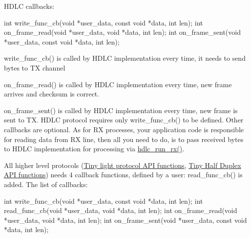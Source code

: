 H\+D\+LC callbacks\+: 
\begin{DoxyCode}
\textcolor{keywordtype}{int} write\_func\_cb(\textcolor{keywordtype}{void} *user\_data, \textcolor{keyword}{const} \textcolor{keywordtype}{void} *data, \textcolor{keywordtype}{int} len);
\textcolor{keywordtype}{int} on\_frame\_read(\textcolor{keywordtype}{void} *user\_data, \textcolor{keywordtype}{void} *data, \textcolor{keywordtype}{int} len);
\textcolor{keywordtype}{int} on\_frame\_sent(\textcolor{keywordtype}{void} *user\_data, \textcolor{keyword}{const} \textcolor{keywordtype}{void} *data, \textcolor{keywordtype}{int} len);
\end{DoxyCode}



\begin{DoxyItemize}
\item write\+\_\+func\+\_\+cb() is called by H\+D\+LC implementation every time, it needs to send bytes to TX channel
\item on\+\_\+frame\+\_\+read() is called by H\+D\+LC implementation every time, new frame arrives and checksum is correct.
\item on\+\_\+frame\+\_\+sent() is called by H\+D\+LC implementation every time, new frame is sent to TX. H\+D\+LC protocol requires only write\+\_\+func\+\_\+cb() to be defined. Other callbacks are optional. As for RX processes, your application code is responsible for reading data from RX line, then all you need to do, is to pass received bytes to H\+D\+LC implementation for processing via \hyperlink{group__HDLC__API_ga911a3f1cb32dd6cadd00223e0097642c}{hdlc\+\_\+run\+\_\+rx()}.
\end{DoxyItemize}

All higher level protocols (\hyperlink{group__LIGHT__API}{Tiny light protocol A\+PI functions}, \hyperlink{group__HALF__DUPLEX__API}{Tiny Half Duplex A\+PI functions}) needs 4 callback functions, defined by a user\+: read\+\_\+func\+\_\+cb() is added. The list of callbacks\+:


\begin{DoxyCode}
\textcolor{keywordtype}{int} write\_func\_cb(\textcolor{keywordtype}{void} *user\_data, \textcolor{keyword}{const} \textcolor{keywordtype}{void} *data, \textcolor{keywordtype}{int} len);
\textcolor{keywordtype}{int} read\_func\_cb(\textcolor{keywordtype}{void} *user\_data, \textcolor{keywordtype}{void} *data, \textcolor{keywordtype}{int} len);
\textcolor{keywordtype}{int} on\_frame\_read(\textcolor{keywordtype}{void} *user\_data, \textcolor{keywordtype}{void} *data, \textcolor{keywordtype}{int} len);
\textcolor{keywordtype}{int} on\_frame\_sent(\textcolor{keywordtype}{void} *user\_data, \textcolor{keyword}{const} \textcolor{keywordtype}{void} *data, \textcolor{keywordtype}{int} len);
\end{DoxyCode}


